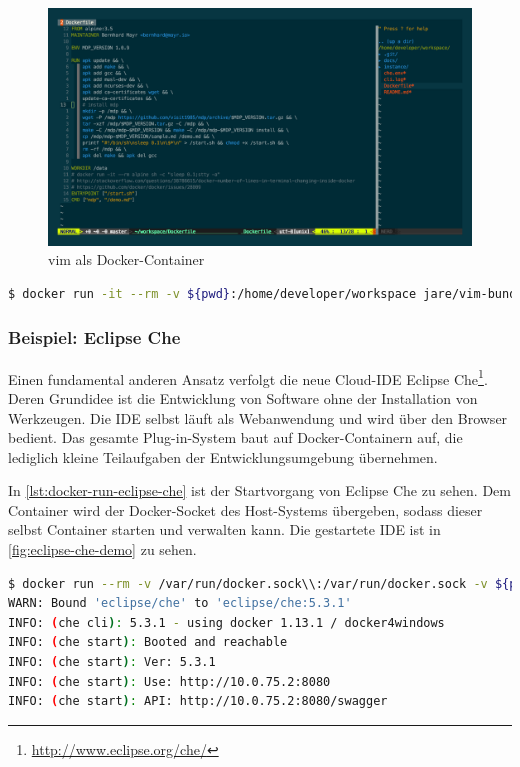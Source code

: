 \begin{figure}[htbp]
    \centering
    \includegraphics[width=0.9\linewidth,clip]{images/vim-demo}
    \caption{vim als Docker-Container}
\label{fig:vim-demo}
\end{figure}

\begin{lstlisting}[caption=Docker-Kommando zum Starten von vim, language=bash, label=lst:docker-run-vim]
$ docker run -it --rm -v ${pwd}:/home/developer/workspace jare/vim-bundle
\end{lstlisting}

\subsubsection{Beispiel: Eclipse Che}
Einen fundamental anderen Ansatz verfolgt die neue Cloud-IDE Eclipse Che\footnote{\url{http://www.eclipse.org/che/}}.
Deren Grundidee ist die Entwicklung von Software ohne der Installation von Werkzeugen.
Die IDE selbst läuft als Webanwendung und wird über den Browser bedient.
Das gesamte Plug-in-System baut auf Docker-Containern auf, die lediglich kleine Teilaufgaben der Entwicklungsumgebung übernehmen.

In \cref{lst:docker-run-eclipse-che} ist der Startvorgang von Eclipse Che zu sehen.
Dem Container wird der Docker-Socket des Host-Systems übergeben, sodass dieser selbst Container starten und verwalten kann.
Die gestartete IDE ist in \cref{fig:eclipse-che-demo} zu sehen.

\begin{lstlisting}[caption=Docker-Kommando zum Starten von Eclipse Che, language=bash, label=lst:docker-run-eclipse-che]
$ docker run --rm -v /var/run/docker.sock\\:/var/run/docker.sock -v ${pwd}:/data eclipse/che start
WARN: Bound 'eclipse/che' to 'eclipse/che:5.3.1'
INFO: (che cli): 5.3.1 - using docker 1.13.1 / docker4windows
INFO: (che start): Booted and reachable
INFO: (che start): Ver: 5.3.1
INFO: (che start): Use: http://10.0.75.2:8080
INFO: (che start): API: http://10.0.75.2:8080/swagger
\end{lstlisting}


